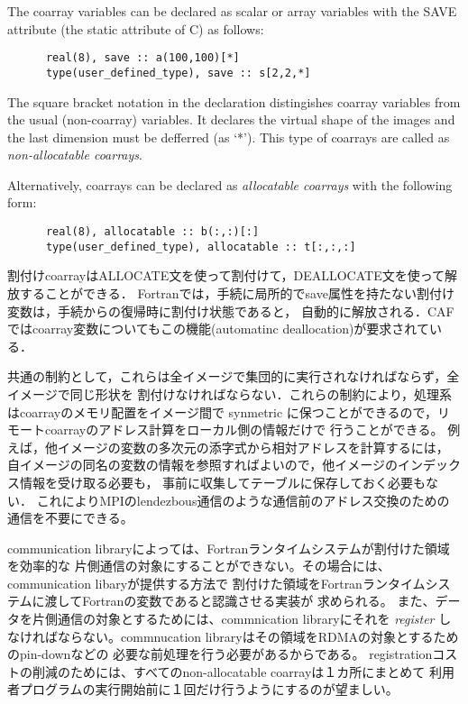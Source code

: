 The coarray variables can be declared as scalar or array variables with the SAVE attribute
(the static attribute of C) as follows:

\begin{verbatim}
      real(8), save :: a(100,100)[*]
      type(user_defined_type), save :: s[2,2,*]
\end{verbatim}

The square bracket notation in the declaration distingishes coarray variables from the usual 
(non-coarray) variables. It declares the virtual shape of the images and the last dimension 
must be defferred (as `*').
This type of coarrays are called as {\em non-allocatable coarrays}. 

Alternatively, coarrays can be declared as {\em allocatable coarrays} with the following form:

\begin{verbatim}
      real(8), allocatable :: b(:,:)[:]
      type(user_defined_type), allocatable :: t[:,:,:]
\end{verbatim}

割付けcoarrayはALLOCATE文を使って割付けて，DEALLOCATE文を使って解放することができる．
Fortranでは，手続に局所的でsave属性を持たない割付け変数は，手続からの復帰時に割付け状態であると，
自動的に解放される．CAFではcoarray変数についてもこの機能(automatinc deallocation)が要求されている．


共通の制約として，これらは全イメージで集団的に実行されなければならず，全イメージで同じ形状を
割付けなければならない．これらの制約により，処理系はcoarrayのメモリ配置をイメージ間で
synmetric に保つことができるので，リモートcoarrayのアドレス計算をローカル側の情報だけで
行うことができる。
例えば，他イメージの変数の多次元の添字式から相対アドレスを計算するには，
自イメージの同名の変数の情報を参照すればよいので，他イメージのインデックス情報を受け取る必要も，
事前に収集してテーブルに保存しておく必要もない．
これによりMPIのlendezbous通信のような通信前のアドレス交換のための通信を不要にできる。

communication libraryによっては、Fortranランタイムシステムが割付けた領域を効率的な
片側通信の対象にすることができない。その場合には、communication libaryが提供する方法で
割付けた領域をFortranランタイムシステムに渡してFortranの変数であると認識させる実装が
求められる。
また、データを片側通信の対象とするためには、commnication libraryにそれを {\em register}
しなければならない。commnucation libraryはその領域をRDMAの対象とするためのpin-downなどの
必要な前処理を行う必要があるからである。
registrationコストの削減のためには、すべてのnon-allocatable coarrayは１カ所にまとめて
利用者プログラムの実行開始前に１回だけ行うようにするのが望ましい。


